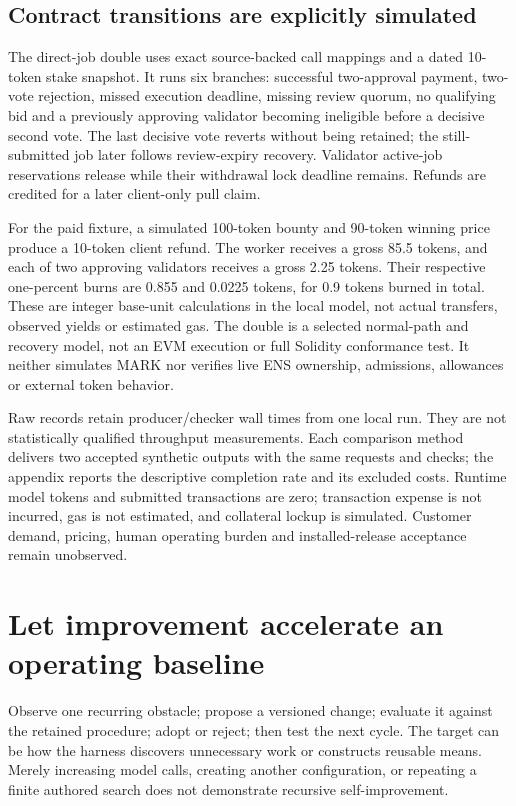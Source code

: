 \documentclass[11pt,letterpaper]{article}
\begin{document}
\subsection{Contract transitions are explicitly simulated}
The direct-job double uses exact source-backed call mappings and a dated 10-token stake snapshot. It runs six branches: successful two-approval payment, two-vote rejection, missed execution deadline, missing review quorum, no qualifying bid and a previously approving validator becoming ineligible before a decisive second vote. The last decisive vote reverts without being retained; the still-submitted job later follows review-expiry recovery. Validator active-job reservations release while their withdrawal lock deadline remains. Refunds are credited for a later client-only pull claim.

For the paid fixture, a simulated 100-token bounty and 90-token winning price produce a 10-token client refund. The worker receives a gross 85.5 tokens, and each of two approving validators receives a gross 2.25 tokens. Their respective one-percent burns are 0.855 and 0.0225 tokens, for 0.9 tokens burned in total. These are integer base-unit calculations in the local model, not actual transfers, observed yields or estimated gas. The double is a selected normal-path and recovery model, not an EVM execution or full Solidity conformance test. It neither simulates MARK nor verifies live ENS ownership, admissions, allowances or external token behavior.

Raw records retain producer/checker wall times from one local run. They are not statistically qualified throughput measurements. Each comparison method delivers two accepted synthetic outputs with the same requests and checks; the appendix reports the descriptive completion rate and its excluded costs. Runtime model tokens and submitted transactions are zero; transaction expense is not incurred, gas is not estimated, and collateral lockup is simulated. Customer demand, pricing, human operating burden and installed-release acceptance remain unobserved.


\FloatBarrier
\section{Let improvement accelerate an operating baseline}
Observe one recurring obstacle; propose a versioned change; evaluate it against the retained procedure; adopt or reject; then test the next cycle. The target can be how the harness discovers unnecessary work or constructs reusable means. Merely increasing model calls, creating another configuration, or repeating a finite authored search does not demonstrate recursive self-improvement.
\end{document}
